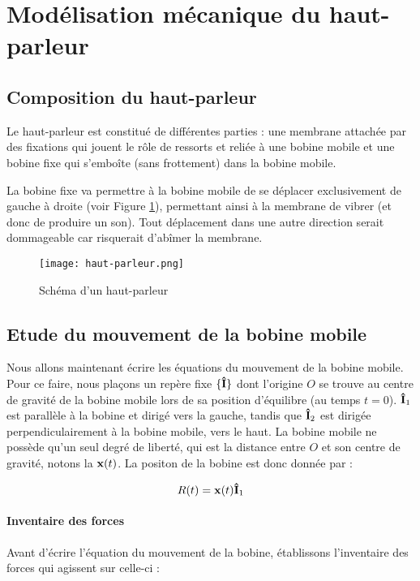 

\section{Modélisation mécanique du haut-parleur}

\subsection{Composition du haut-parleur}
Le haut-parleur est constitué de différentes parties : une membrane
attachée par des fixations qui jouent le rôle de ressorts et reliée à 
une bobine mobile et une bobine fixe qui s'emboîte (sans frottement) 
dans la bobine mobile.

La bobine fixe va permettre à la bobine mobile de se déplacer exclusivement de gauche
à droite (voir Figure \ref{hp-scheme}), permettant ainsi à la membrane de vibrer 
(et donc de produire un son). Tout déplacement dans une autre direction serait dommageable
car risquerait d'abîmer la membrane.

\begin{figure}[ht!]
	\centering
	\texttt{[image: haut-parleur.png]}
	\caption{Schéma d'un haut-parleur}
	\label{hp-scheme}
\end{figure}

\subsection{Etude du mouvement de la bobine mobile}
Nous allons maintenant écrire les équations du mouvement de la bobine mobile.
Pour ce faire, nous plaçons un repère fixe $\{{\bf\hat{I}}\}$ dont l'origine $O$ se trouve
au centre de gravité de la bobine mobile lors de sa position d'équilibre (au 
temps $t=0$). ${\bf\hat{ I}}_1$ est parallèle à la bobine et dirigé vers la gauche, tandis que
${\bf\hat{ I}}_2$ est dirigée perpendiculairement à la bobine mobile, vers le haut.
La bobine mobile ne possède qu'un seul degré de liberté, qui
est la distance entre $O$ et son centre de gravité, notons la ${\bf x}(t)$.
La positon de la bobine est donc donnée par :

$$R(t) = {\bf x}(t) {\bf\hat{ I}}_1$$ 

\paragraph{Inventaire des forces}
Avant d'écrire l'équation du mouvement de la bobine, établissons l'inventaire
des forces qui agissent sur celle-ci :

